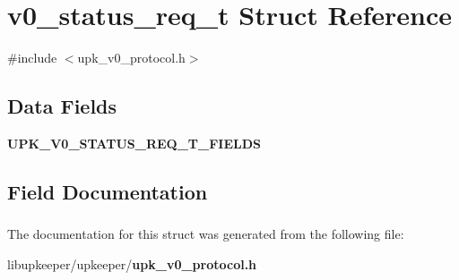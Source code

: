 \section{v0\_\-status\_\-req\_\-t Struct Reference}
\label{structv0__status__req__t}


{\ttfamily \#include $<$upk\_\-v0\_\-protocol.h$>$}

\subsection*{Data Fields}
\begin{DoxyCompactItemize}
\item 
{\bf UPK\_\-V0\_\-STATUS\_\-REQ\_\-T\_\-FIELDS}
\end{DoxyCompactItemize}


\subsection{Field Documentation}
\subsubsection[{UPK\_\-V0\_\-STATUS\_\-REQ\_\-T\_\-FIELDS}]{}\label{structv0__status__req__t_a96bbc7181dd0e05b6d35317074c15e37}


The documentation for this struct was generated from the following file:\begin{DoxyCompactItemize}
\item 
libupkeeper/upkeeper/{\bf upk\_\-v0\_\-protocol.h}\end{DoxyCompactItemize}
